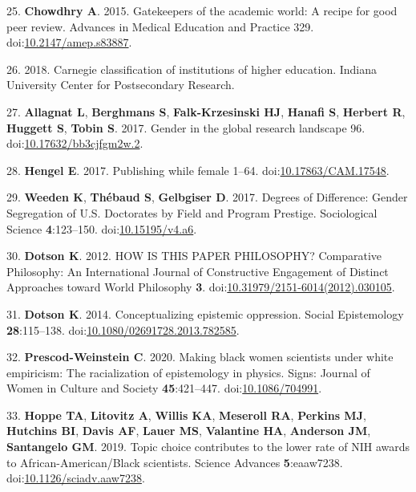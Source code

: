 \documentclass[11pt,]{article}
\begin{document}
\hypertarget{ref-Chowdhry2015}{}
25. \textbf{Chowdhry A}. 2015. Gatekeepers of the academic world: A
recipe for good peer review. Advances in Medical Education and Practice
329.
doi:\href{https://doi.org/10.2147/amep.s83887}{10.2147/amep.s83887}.

\hypertarget{ref-Carnegie2018}{}
26. 2018. Carnegie classification of institutions of higher education.
Indiana University Center for Postsecondary Research.

\hypertarget{ref-allagnat_gender_2017}{}
27. \textbf{Allagnat L}, \textbf{Berghmans S}, \textbf{Falk-Krzesinski
HJ}, \textbf{Hanafi S}, \textbf{Herbert R}, \textbf{Huggett S},
\textbf{Tobin S}. 2017. Gender in the global research landscape 96.
doi:\href{https://doi.org/10.17632/bb3cjfgm2w.2}{10.17632/bb3cjfgm2w.2}.

\hypertarget{ref-erin_hengel_publishing_2017}{}
28. \textbf{Hengel E}. 2017. Publishing while female 1--64.
doi:\href{https://doi.org/10.17863/CAM.17548}{10.17863/CAM.17548}.

\hypertarget{ref-weeden_degrees_2017}{}
29. \textbf{Weeden K}, \textbf{Thébaud S}, \textbf{Gelbgiser D}. 2017.
Degrees of Difference: Gender Segregation of U.S. Doctorates by Field
and Program Prestige. Sociological Science \textbf{4}:123--150.
doi:\href{https://doi.org/10.15195/v4.a6}{10.15195/v4.a6}.

\hypertarget{ref-Dotson2012}{}
30. \textbf{Dotson K}. 2012. HOW IS THIS PAPER PHILOSOPHY? Comparative
Philosophy: An International Journal of Constructive Engagement of
Distinct Approaches toward World Philosophy \textbf{3}.
doi:\href{https://doi.org/10.31979/2151-6014(2012).030105}{10.31979/2151-6014(2012).030105}.

\hypertarget{ref-Dotson2014}{}
31. \textbf{Dotson K}. 2014. Conceptualizing epistemic oppression.
Social Epistemology \textbf{28}:115--138.
doi:\href{https://doi.org/10.1080/02691728.2013.782585}{10.1080/02691728.2013.782585}.

\hypertarget{ref-PrescodWeinstein2020}{}
32. \textbf{Prescod-Weinstein C}. 2020. Making black women scientists
under white empiricism: The racialization of epistemology in physics.
Signs: Journal of Women in Culture and Society \textbf{45}:421--447.
doi:\href{https://doi.org/10.1086/704991}{10.1086/704991}.

\hypertarget{ref-Hoppe2019}{}
33. \textbf{Hoppe TA}, \textbf{Litovitz A}, \textbf{Willis KA},
\textbf{Meseroll RA}, \textbf{Perkins MJ}, \textbf{Hutchins BI},
\textbf{Davis AF}, \textbf{Lauer MS}, \textbf{Valantine HA},
\textbf{Anderson JM}, \textbf{Santangelo GM}. 2019. Topic choice
contributes to the lower rate of NIH awards to African-American/Black
scientists. Science Advances \textbf{5}:eaaw7238.
doi:\href{https://doi.org/10.1126/sciadv.aaw7238}{10.1126/sciadv.aaw7238}.
\end{document}
